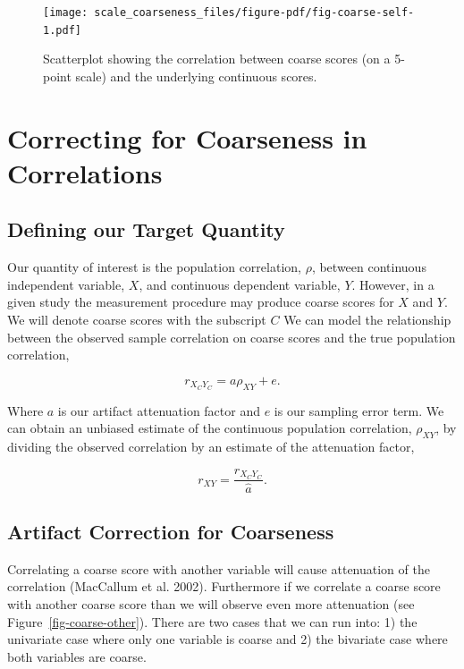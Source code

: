 \documentclass[
  letterpaper,
  DIV=11,
  numbers=noendperiod]{scrreprt}
\begin{document}
\begin{figure}[H]

{\centering \texttt{[image: scale\_coarseness\_files/figure-pdf/fig-coarse-self-1.pdf]}

}

\caption{\label{fig-coarse-self}Scatterplot showing the correlation
between coarse scores (on a 5-point scale) and the underlying continuous
scores.}

\end{figure}

\hypertarget{correcting-for-coarseness-in-correlations}{%
\section{Correcting for Coarseness in
Correlations}\label{correcting-for-coarseness-in-correlations}}

\hypertarget{defining-our-target-quantity-2}{%
\subsection{Defining our Target
Quantity}\label{defining-our-target-quantity-2}}

Our quantity of interest is the population correlation, \(\rho\),
between continuous independent variable, \(X\), and continuous dependent
variable, \(Y\). However, in a given study the measurement procedure may
produce coarse scores for \(X\) and \(Y\). We will denote coarse scores
with the subscript \(C\) We can model the relationship between the
observed sample correlation on coarse scores and the true population
correlation,

\[
r_{X_CY_C} = a\rho_{XY}+e.
\]

Where \(a\) is our artifact attenuation factor and \(e\) is our sampling
error term. We can obtain an unbiased estimate of the continuous
population correlation, \(\rho_{XY}\), by dividing the observed
correlation by an estimate of the attenuation factor,

\[
r_{XY} = \frac{r_{X_CY_C}}{\hat{a}}.
\]

\hypertarget{sec-coarse-cor}{%
\subsection{Artifact Correction for Coarseness}\label{sec-coarse-cor}}

Correlating a coarse score with another variable will cause attenuation
of the correlation (MacCallum et al. 2002). Furthermore if we correlate
a coarse score with another coarse score than we will observe even more
attenuation (see Figure~\ref{fig-coarse-other}). There are two cases
that we can run into: 1) the univariate case where only one variable is
coarse and 2) the bivariate case where both variables are coarse.
\end{document}
